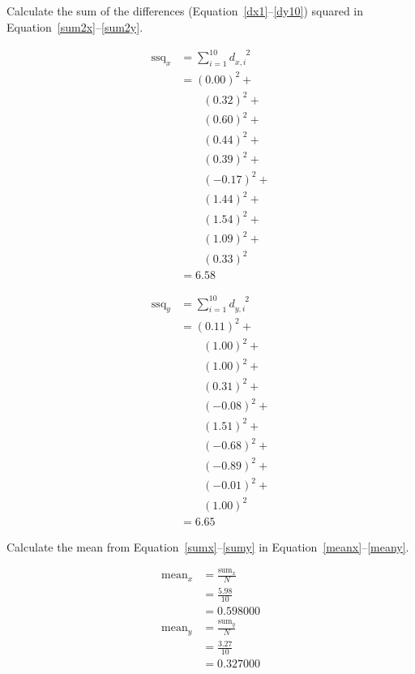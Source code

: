 \documentclass[twocolumn]{article}
\begin{document}
Calculate the sum of the differences (Equation~\ref{dx1}--\ref{dy10}) squared in Equation~\ref{sum2x}--\ref{sum2y}.

\begin{align}
\text{ssq}_{x} &= \sum_{i=1}^{10} d_{x,i}^{\phantom{x,i}2} \nonumber\\
 &= (0.00)^2 + \nonumber\\
 &\quad\quad (0.32)^2 + \nonumber\\
 &\quad\quad (0.60)^2 + \nonumber\\
 &\quad\quad (0.44)^2 + \nonumber\\
 &\quad\quad (0.39)^2 + \nonumber\\
 &\quad\quad (-0.17)^2 + \nonumber\\
 &\quad\quad (1.44)^2 + \nonumber\\
 &\quad\quad (1.54)^2 + \nonumber\\
 &\quad\quad (1.09)^2 + \nonumber\\
 &\quad\quad (0.33)^2 \nonumber\\
 &= 6.58 \label{sum2x}
\end{align}

\begin{align}
\text{ssq}_{y} &= \sum_{i=1}^{10} d_{y,i}^{\phantom{y,i}2} \nonumber\\
 &= (0.11)^2 + \nonumber\\
 &\quad\quad (1.00)^2 + \nonumber\\
 &\quad\quad (1.00)^2 + \nonumber\\
 &\quad\quad (0.31)^2 + \nonumber\\
 &\quad\quad (-0.08)^2 + \nonumber\\
 &\quad\quad (1.51)^2 + \nonumber\\
 &\quad\quad (-0.68)^2 + \nonumber\\
 &\quad\quad (-0.89)^2 + \nonumber\\
 &\quad\quad (-0.01)^2 + \nonumber\\
 &\quad\quad (1.00)^2 \nonumber\\
 &= 6.65 \label{sum2y}
\end{align}

Calculate the mean from Equation~\ref{sumx}--\ref{sumy} in Equation~\ref{meanx}--\ref{meany}.

\begin{align}
\text{mean}_{x} &= \frac{\text{sum}_{x}}{N} \nonumber\\
 &= \frac{5.98}{10} \nonumber\\
 &= 0.598000 \label{meanx}\\
\text{mean}_{y} &= \frac{\text{sum}_{y}}{N} \nonumber\\
 &= \frac{3.27}{10} \nonumber\\
 &= 0.327000 \label{meany}
\end{align}
\end{document}
